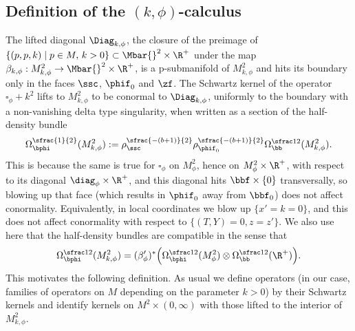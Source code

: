 \subsection{Definition of the $(k,\phi)$-calculus}\label{subsec:def psi k phi}
The lifted diagonal $\Diag_{k,\phi}$, \ie the closure of the preimage
of $\{(p,p,k)\mid p\in M,\, k>0\}\subset \Mbar{}^2\times\R^+$ under the map
$\beta_{k,\phi}:M^2_{k,\phi}\to \Mbar{}^2\times\R^+$,
is a p-submanifold of $M^2_{k,\phi}$ and hits its boundary only in the faces $\ssc$, $\phif_0$ and $\zf$.
The Schwartz kernel of the operator $\square_\phi+k^2$ lifts to $M^2_{k,\phi}$ to be conormal to
$\Diag_{k,\phi}$, uniformly to the boundary with a non-vanishing delta type singularity, when written as a section of the half-density bundle
\begin{equation}
\Omega^{\sfrac{1}{2}}_{\bphi}(M^{2}_{k, \phi}) := \rho_{\ssc}^{\sfrac{-(b+1)}{2}}
\rho_{\phif_0}^{\sfrac{-(b+1)}{2}} \Omega^{\sfrac12}_\bb(M^{2}_{k, \phi}).
\end{equation}
This is because the same is true for $\square_\phi$ on $M^2_\phi$, hence on $M^2_\phi\times\R^+$,
with respect to its diagonal $\diag_\phi\times\R^+$, and this diagonal hits $\bbf\times\{0\}$ transversally,
so blowing up that face (which results in $\phif_0$ away from $\bbf_0$) does not affect conormality.
Equivalently, in local coordinates we blow up $\{x'=k=0\}$, and this does not affect conormality with
respect to $\{(T,Y)=0,z=z'\}$. We also use here that the half-density bundles are compatible in the
sense that
\[
\Omega^{\sfrac12}_{\bphi}(M^2_{k,\phi}) =(\beta_\phi')^*\Bigl(\Omega^{\sfrac12}_{\bphi}(M^2_\phi)
\otimes\Omega^{\sfrac12}_\bb(\R^+)\Bigr).
\]
This motivates the following definition. As usual we define operators
(in our case, families of operators on $M$ depending on the parameter $k>0$)
by their Schwartz kernels and identify kernels on ${M}^2\times(0,\infty)$ with
those lifted to the interior of $M^2_{k,\phi}$.

